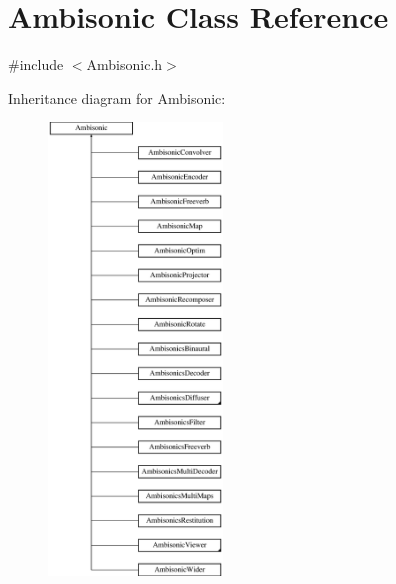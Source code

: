 \hypertarget{class_ambisonic}{\section{Ambisonic Class Reference}
\label{class_ambisonic}
}


{\ttfamily \#include $<$Ambisonic.\-h$>$}

Inheritance diagram for Ambisonic\-:\begin{figure}[H]
\begin{center}
\leavevmode
\includegraphics[height=12.000000cm]{class_ambisonic}
\end{center}
\end{figure}
